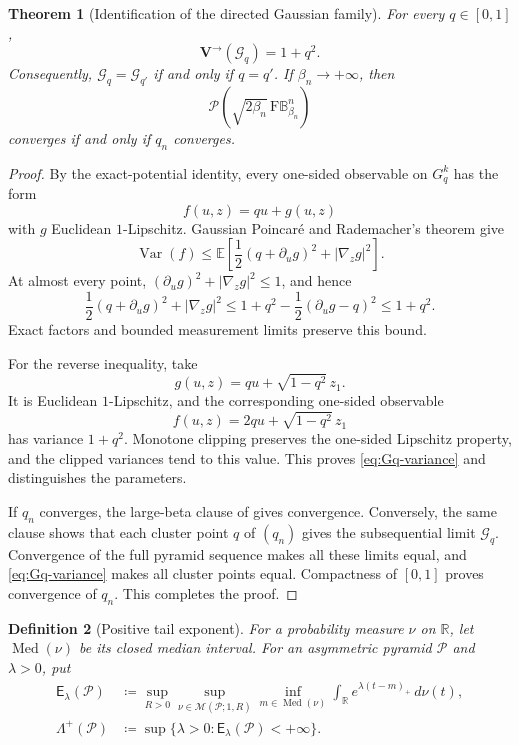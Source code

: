 \documentclass[10pt,a4paper]{amsart}
\numberwithin{equation}{section}
\newtheorem{theorem}{Theorem}[section]
\newtheorem{definition}[theorem]{Definition}
\newcommand{\R}{\mathbb R}
\newcommand{\BetaBall}{\mathrm F\mathbb B^n_{\beta_n}}
\newcommand{\Pyr}{\mathcal P}
\newcommand{\Var}{\operatorname{Var}}
\begin{document}
\begin{theorem}[Identification of the directed Gaussian family]\label{thm:Gq-classification}
For every $q\in[0,1]$,
\begin{equation}\label{eq:Gq-variance} \mathbf{V}^{\to}(\mathcal G_q)=1+q^2. \end{equation}
Consequently, $\mathcal G_q=\mathcal G_{q'}$ if and only if $q=q'$.  If $\beta_n\to+\infty$, then
\[ \Pyr(\sqrt{2\beta_n}\,\BetaBall) \]
converges if and only if $q_n$ converges.
\end{theorem}

\begin{proof}
By the exact-potential identity, every one-sided observable on $G_q^k$ has the form
\[ f(u,z)=qu+g(u,z) \]
with $g$ Euclidean $1$-Lipschitz.  Gaussian Poincar\'e and Rademacher's theorem give
\[ \Var(f) \le\mathbb E\left[\frac12(q+\partial_ug)^2+|\nabla_zg|^2\right]. \]
At almost every point, $(\partial_ug)^2+|\nabla_zg|^2\le1$, and hence
\[ \frac12(q+\partial_ug)^2+|\nabla_zg|^2 \le1+q^2-\frac12(\partial_ug-q)^2 \le1+q^2. \]
Exact factors and bounded measurement limits preserve this bound.

For the reverse inequality, take
\[ g(u,z)=qu+\sqrt{1-q^2}\,z_1. \]
It is Euclidean $1$-Lipschitz, and the corresponding one-sided observable
\[ f(u,z)=2qu+\sqrt{1-q^2}\,z_1 \]
has variance $1+q^2$.  Monotone clipping preserves the one-sided Lipschitz property, and the clipped variances tend to this value.  This proves \eqref{eq:Gq-variance} and distinguishes the parameters.

If $q_n$ converges, the large-beta clause of  gives convergence.  Conversely, the same clause shows that each cluster point $q$ of $(q_n)$ gives the subsequential limit $\mathcal G_q$.  Convergence of the full pyramid sequence makes all these limits equal, and \eqref{eq:Gq-variance} makes all cluster points equal.  Compactness of $[0,1]$ proves convergence of $q_n$.  This completes the proof.
\end{proof}

\begin{definition}[Positive tail exponent]\label{def:tail-exponent}
For a probability measure $\nu$ on $\R$, let $\operatorname{Med}(\nu)$ be its closed median interval.  For an asymmetric pyramid $\mathcal P$ and $\lambda>0$, put
\begin{align}
 \mathsf E_\lambda(\mathcal P)
 &\coloneqq\sup_{R>0}\sup_{\nu\in\mathcal M(\mathcal P;1,R)}
 \inf_{m\in\operatorname{Med}(\nu)}
 \int_\R e^{\lambda(t-m)_+}\,d\nu(t),
 \label{eq:tail-functional}\\
 \Lambda^+(\mathcal P)
 &\coloneqq\sup\{\lambda>0\colon\mathsf E_\lambda(\mathcal P)<+\infty\}.
 \label{eq:tail-exponent}
\end{align}
\end{definition}
\end{document}
